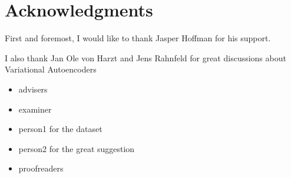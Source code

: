\chapter{Acknowledgments}

First and foremost, I would like to thank Jasper Hoffman for his support. 

I also thank Jan Ole von Harzt and Jens Rahnfeld for great discussions about Variational Autoencoders 
\begin{itemize}
\item{advisers}
\item{examiner}
\item{person1 for the dataset}
\item{person2 for the great suggestion}
\item{proofreaders}
\end{itemize}